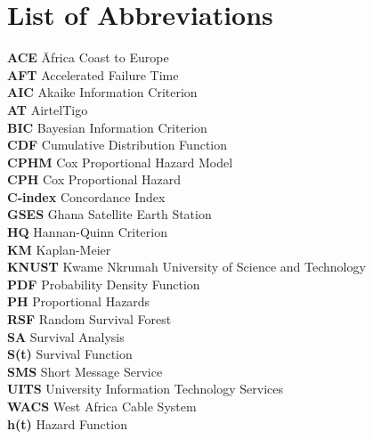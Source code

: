 \documentclass[doublespacing,12pt]{report}
\begin{document}
\newpage
\chapter*{List of Abbreviations}

\begin{tabbing}
    \textbf{ACE} \hspace{2cm} \= Africa Coast to Europe \\
    \textbf{AFT} \> Accelerated Failure Time \\
    \textbf{AIC} \> Akaike Information Criterion \\
    \textbf{AT} \> AirtelTigo \\
    \textbf{BIC} \> Bayesian Information Criterion \\
    \textbf{CDF} \> Cumulative Distribution Function \\
    \textbf{CPHM} \> Cox Proportional Hazard Model \\
    \textbf{CPH} \> Cox Proportional Hazard \\
    \textbf{C-index} \> Concordance Index \\
    \textbf{GSES} \> Ghana Satellite Earth Station \\
    \textbf{HQ} \> Hannan-Quinn Criterion \\
    \textbf{KM} \> Kaplan-Meier \\
    \textbf{KNUST} \> Kwame Nkrumah University of Science and Technology \\
    \textbf{PDF} \> Probability Density Function \\
    \textbf{PH} \> Proportional Hazards \\
    \textbf{RSF} \> Random Survival Forest \\
    \textbf{SA} \> Survival Analysis \\
    \textbf{S(t)} \> Survival Function \\
    \textbf{SMS} \> Short Message Service \\
    \textbf{UITS} \> University Information Technology Services \\
    \textbf{WACS} \> West Africa Cable System \\
    \textbf{h(t)} \> Hazard Function \\
\end{tabbing}



\newpage
\renewcommand{\contentsname}{Table of Content} %
\tableofcontents %
\end{document}
